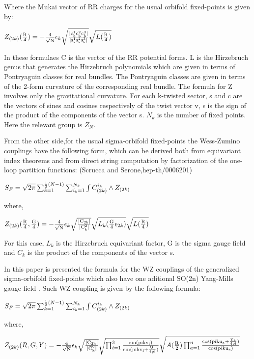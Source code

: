 \documentclass[a4paper,a4paper]{article}
\begin{document}
Where the Mukai vector of RR charges for the usual orbifold fixed-points is given by:

\begin{center}
{  $ Z_{(2k)}(\frac{\rm R}{\rm 4}) =-\frac{\rm 4}{\rm \sqrt{N}}\epsilon_k\sqrt{\frac{\rm \vert{\rm c_k^1c_k^2c_k^3}\vert}{\rm\vert{\rm s_k^1s_k^2s_k^3}\vert }}\sqrt{L(\frac{\rm R}{\rm 4})}  $ }
\end{center}

In these  formulaes C is the vector of the RR potential forms. L is the Hirzebruch genus that generates the Hirzebruch polynomials which are given in terms of Pontryaguin classes for real bundles. The Pontryaguin classes are given in terms of the 2-form curvature of the corresponding real bundle. The formula for Z involves only the gravitational curvature. For each k-twisted sector, s and c are the vectors of sines and cosines respectively of the twist vector v, $\epsilon$ is the sign of the product of the components of the vector  s. $N_k$ is the number of fixed points. Here the relevant group is $Z_N$.

From the other side,for the usual sigma-orbifold fixed-points the Wess-Zumino couplings have the following form, which can be derived both from equivariant index theorems and from direct string computation by factorization of the one-loop partition functions: (Scrucca and Serone,hep-th/0006201)
\begin{center}
{  $ S_{F} = \sqrt{2\pi}\sum_{k=1}^{\frac{\rm 1}{\rm 2}(N-1)}\sum_{i_k=1}^{N_k}\int{C_{(2k)}^{i_k}\wedge{Z_{(2k)}}}$ }
\end{center}     
where,
\begin{center}
{  $ Z_{(2k)}(\frac{\rm R}{\rm 4},\frac{\rm G}{\rm 4}) =-\frac{\rm 4}{\rm \sqrt{N}}\epsilon_k\sqrt{\frac{\rm \vert{\rm C_{2k}}\vert}{\rm\vert{\rm C_k^2}\vert }}\sqrt{L_k(\frac{\rm G}{\rm 4}\epsilon_{2k})}\sqrt{L(\frac{\rm R}{\rm 4})}  $ }
\end{center}
For this case, $L_k$ is the Hirzebruch equivariant factor, G is the sigma gauge field and $C_k$ is the product of the components of the vector s.

In this paper is presented the formula for the WZ couplings  of the generalized sigma-orbifold fixed-points which also have one  aditional SO(2n) Yang-Mills gauge field  .  Such WZ coupling is given by the following formula:
\begin{center}
{  $ S_{F} = \sqrt{2\pi}\sum_{k=1}^{\frac{\rm 1}{\rm 2}(N-1)}\sum_{i_k=1}^{N_k}\int{C_{(2k)}^{i_k}\wedge{Z_{(2k)}}}$ }
\end{center}     
where,
\begin{center}
{  $ Z_{(2k)}(R,G,Y) =-\frac{\rm 4}{\rm \sqrt{N}}\epsilon_k\sqrt{\frac{\rm \vert{\rm C_{2k}}\vert}{\rm\vert{\rm C_k^2}\vert }}\sqrt{\prod_{i=1}^3\frac{\rm sin(pikv_i)}{\rm sin(pikv_i+\frac{\rm G_i}{\rm 4pi})}}\sqrt{A(\frac{\rm R}{\rm 2})\prod_{a=1}^n\frac{\rm cos(piku_a+\frac{\rm Y_a}{\rm 4pi})}{\rm cos(piku_a)}}  $ }
\end{center} 
\end{document}
